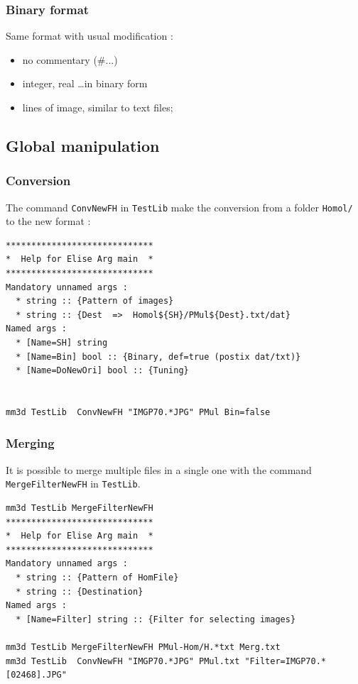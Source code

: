 \subsubsection{Binary format}

Same format with usual modification :

\begin{itemize}
    \item no commentary (\#...)
    \item integer, real \dots in binary form
    \item lines of image, similar to text files;

\end{itemize}


\subsection{Global manipulation}


\subsubsection{Conversion}

The command {\tt ConvNewFH} in {\tt TestLib} make the conversion from a folder
{\tt Homol/} to the new format :

\begin{verbatim}
*****************************
*  Help for Elise Arg main  *
*****************************
Mandatory unnamed args : 
  * string :: {Pattern of images}
  * string :: {Dest  =>  Homol${SH}/PMul${Dest}.txt/dat}
Named args : 
  * [Name=SH] string
  * [Name=Bin] bool :: {Binary, def=true (postix dat/txt)}
  * [Name=DoNewOri] bool :: {Tuning}


mm3d TestLib  ConvNewFH "IMGP70.*JPG" PMul Bin=false
\end{verbatim}


\subsubsection{Merging}

It is possible to merge multiple files in a single  one with
the command {\tt MergeFilterNewFH} in {\tt TestLib}.

\begin{verbatim}
mm3d TestLib MergeFilterNewFH
*****************************
*  Help for Elise Arg main  *
*****************************
Mandatory unnamed args : 
  * string :: {Pattern of HomFile}
  * string :: {Destination}
Named args : 
  * [Name=Filter] string :: {Filter for selecting images}

mm3d TestLib MergeFilterNewFH PMul-Hom/H.*txt Merg.txt
mm3d TestLib  ConvNewFH "IMGP70.*JPG" PMul.txt "Filter=IMGP70.*[02468].JPG"
\end{verbatim}

